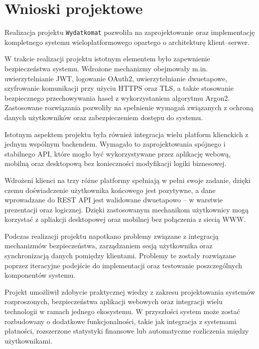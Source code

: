 \chapter{Wnioski projektowe}

Realizacja projektu \verb|Wydatkomat| pozwoliła na zaprojektowanie oraz implementację kompletnego systemu wieloplatformowego opartego o architekturę klient--serwer.

W trakcie realizacji projektu istotnym elementem było zapewnienie bezpieczeństwa systemu. Wdrożone mechanizmy obejmowały m.in. uwierzytelnianie JWT, logowanie OAuth2, uwierzytelnianie dwuetapowe, szyfrowanie komunikacji przy użyciu HTTPS oraz TLS, a także stosowanie bezpiecznego przechowywania haseł z wykorzystaniem algorytmu Argon2. Zastosowane rozwiązania pozwoliły na spełnienie wymagań związanych z ochroną danych użytkowników oraz zabezpieczeniem dostępu do systemu.

Istotnym aspektem projektu była również integracja wielu platform klienckich z jednym wspólnym backendem. Wymagało to zaprojektowania spójnego i stabilnego API, które mogło być wykorzystywane przez aplikację webową, mobilną oraz desktopową bez konieczności modyfikacji logiki biznesowej.

Wdrożeni klienci na trzy różne platformy spełniają w pełni swoje zadanie, dzięki czemu doświadczenie użytkownika końcowego jest pozytywne, a dane wprowadzane do REST API jest walidowane dwuetapowo -- w warstwie prezentacji oraz logicznej. Dzięki zastosowanym mechanikom użytkownicy mogą korzystać z apliakcji desktopowej oraz mobilnej bez połączenia z siecią WWW.

Podczas realizacji projektu napotkano problemy związane z integracją mechanizmów bezpieczeństwa, zarządzaniem sesją użytkownika oraz synchronizacją danych pomiędzy klientami. Problemy te zostały rozwiązane poprzez iteracyjne podejście do implementacji oraz testowanie poszczególnych komponentów systemu.

Projekt umożliwił zdobycie praktycznej wiedzy z zakresu projektowania systemów rozproszonych, bezpieczeństwa aplikacji webowych oraz integracji wielu technologii w ramach jednego ekosystemu. W przyszłości system może zostać rozbudowany o dodatkowe funkcjonalności, takie jak integracja z systemami płatności, rozszerzone statystyki finansowe lub automatyczne rozliczenia między użytkownikami.